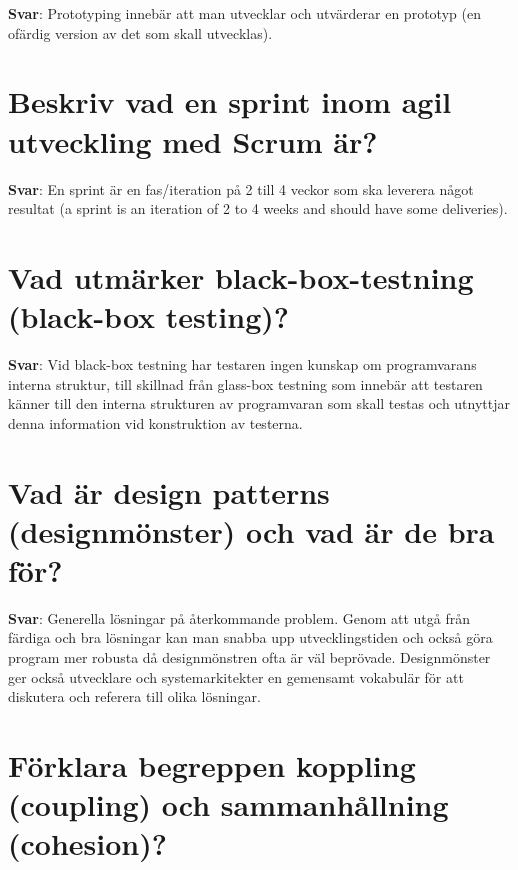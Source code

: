 \documentclass[a4paper,11pt,oneside]{book}
\begin{document}
\begin{sloppypar}
\label{q:235:sa:sv:True}

\textbf{Svar}: Prototyping inneb\"ar att man utvecklar och utv\"arderar en prototyp (en of\"ardig version av det som skall utvecklas).



\section{Beskriv vad en sprint inom agil utveckling med Scrum \"ar?}

\label{q:236:sa:sv:True}

\textbf{Svar}: En sprint \"ar en fas/iteration p\r{a} 2 till 4 veckor som ska leverera n\r{a}got resultat (a sprint is an iteration of 2 to 4 weeks and should have some deliveries).



\section{Vad utm\"arker black-box-testning (black-box testing)?}

\label{q:237:sa:sv:True}

\textbf{Svar}: Vid black-box testning har testaren ingen kunskap om programvarans interna struktur, till skillnad fr\r{a}n glass-box testning som inneb\"ar att testaren k\"anner till den interna strukturen av programvaran som skall testas och utnyttjar denna information vid konstruktion av testerna.



\section{Vad \"ar design patterns (designm\"onster) och vad \"ar de bra f\"or?}

\label{q:238:sa:sv:True}

\textbf{Svar}: Generella l\"osningar p\r{a} \r{a}terkommande problem. Genom att utg\r{a} fr\r{a}n f\"ardiga och bra l\"osningar kan man snabba upp utvecklingstiden och ocks\r{a} g\"ora program mer robusta d\r{a} designm\"onstren ofta \"ar v\"al bepr\"ovade. Designm\"onster ger ocks\r{a} utvecklare och systemarkitekter en gemensamt vokabul\"ar f\"or att diskutera och referera till olika l\"osningar.



\section{F\"orklara begreppen koppling (coupling) och sammanh\r{a}llning (cohesion)?}


\end{sloppypar}
\end{document}
